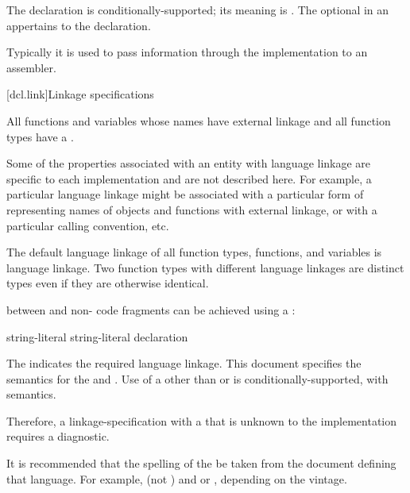 The  declaration is conditionally-supported; its meaning is
.
The optional  in
an  appertains to the  declaration.
\begin{note}
Typically it is used to pass information through the implementation to
an assembler.
\end{note}

[dcl.link]{Linkage specifications}%

\pnum
All functions and variables whose names have external linkage
and all function types
have a .
\begin{note}
Some of the properties associated with an entity with language linkage
are specific to each implementation and are not described here. For
example, a particular language linkage might be associated with a
particular form of representing names of objects and functions with
external linkage, or with a particular calling convention, etc.
\end{note}
The default language linkage of all function types, functions, and
variables is \Cpp{} language linkage. Two function types with
different language linkages are distinct types even if they are
otherwise identical.

\pnum
{} between \Cpp{} and  non-\Cpp{} code fragments can
be achieved using a :
%
%
%
\begin{bnf}
\br
     string-literal \terminal{\{}  \terminal{\}}\br
     string-literal declaration
\end{bnf}

The  indicates the required language linkage.
This document specifies the semantics for the
  and . Use of a
 other than  or  is
conditionally-supported, with  semantics.
\begin{note}
Therefore, a linkage-specification with a  that
is unknown to the implementation requires a diagnostic.
\end{note}
\begin{note}
It is recommended that the spelling of the  be
taken from the document defining that language. For example, 
(not ) and  or , depending on
the vintage.
\end{note}

